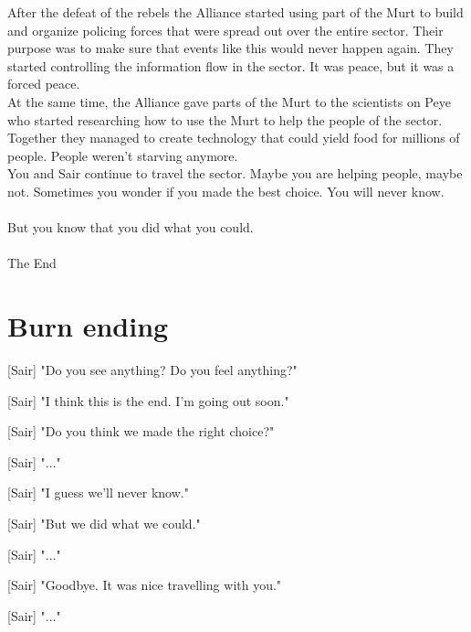 \documentclass[a4paper,12pt]{article}
\begin{document}
After the defeat of the rebels the Alliance started using part of the Murt to build and organize policing forces that were
spread out over the entire sector. Their purpose was to make sure that events like this would never happen again. 
They started controlling the information flow in the sector. It was peace, but it was a forced peace.\\

At the same time, the Alliance gave parts of the Murt to the scientists on Peye who started researching how to use the Murt
to help the people of the sector. Together they managed to create
technology that could yield food for millions of people. People weren't starving anymore.\\

You and Sair continue to travel the sector. Maybe you are helping people, maybe not.
Sometimes you wonder if you made the best choice. You will never know.\\\\
But you know that you did what you could.\\\\
The End

\section{Burn ending}

[Sair] "Do you see anything? Do you feel anything?"

[Sair] "I think this is the end. I'm going out soon."

[Sair] "Do you think we made the right choice?"

[Sair] "..."

[Sair] "I guess we'll never know."

[Sair] "But we did what we could."

[Sair] "..."

[Sair] "Goodbye. It was nice travelling with you."

[Sair] "..."
\end{document}
